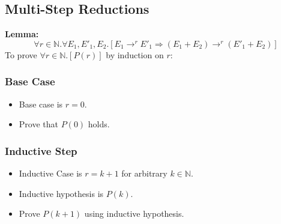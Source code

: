 \documentclass{report}
\begin{document}
        \subsection*{Multi-Step Reductions}
            \textbf{Lemma:}
            \[\forall r \in \mathbb{N}. \forall E_1, E'_1, E_2 . [E_1 \to^r E'_1 \Rightarrow (E_1 + E_2) \to^r (E'_1 + E_2)]\]
            To prove $\forall r \in \mathbb{N} . [P(r)]$ by induction on $r$:
            \subsubsection*{Base Case}
                \begin{itemize}
                    \item Base case is $r = 0$.
                    \item Prove that $P(0)$ holds.
                \end{itemize}
            \subsubsection*{Inductive  Step}
                \begin{itemize}
                    \item Inductive Case is $r = k + 1$ for arbitrary $k \in \mathbb{N}$.
                    \item Inductive hypothesis is $P(k)$.
                    \item Prove $P(k + 1)$ using inductive hypothesis.
                \end{itemize}
\end{document}
